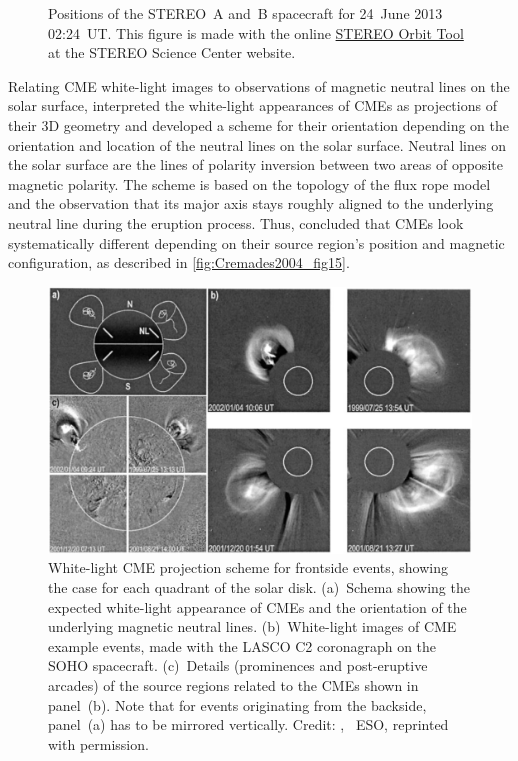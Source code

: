 \begin{figure}[htb]
\begin{floatrow}
{		}{
			\caption[]
			{Positions of the STEREO~A and~B spacecraft for 24~June 2013 02:24~UT. This figure is made with the online \href{https://stereo-ssc.nascom.nasa.gov/cgi-bin/make_where_gif}{STEREO Orbit Tool} at the STEREO Science Center website\protect\footnotemark.}
			\label{fig:STEREO_positions_w_269707595}
		}
	\end{floatrow}
\end{figure}

Relating CME white-light images to observations of magnetic neutral lines on the solar surface, \citet{Cremades2004} interpreted the white-light appearances of CMEs as projections of their 3D geometry and developed a scheme for their orientation depending on the orientation and location of the neutral lines on the solar surface. Neutral lines on the solar surface are the lines of polarity inversion between two areas of opposite magnetic polarity. The scheme is based on the topology of the flux rope model and the observation that its major axis stays roughly aligned to the underlying neutral line during the eruption process. Thus, \citet{Cremades2004} concluded that CMEs look systematically different depending on their source region's position and magnetic configuration, as described in \autoref{fig:Cremades2004_fig15}.
\begin{figure}[htb]
	\centering
	\includegraphics[width=\textwidth]{figures_of_others/images/Cremades2004_fig15.png}
	\caption[]
	{White-light CME projection scheme for frontside events, showing the case for each quadrant of the solar disk. (a)~Schema showing the expected white-light appearance of CMEs and the orientation of the underlying magnetic neutral lines. (b)~White-light images of CME example events, made with the LASCO C2 coronagraph on the SOHO spacecraft. (c)~Details (prominences and post-eruptive arcades) of the source regions related to the CMEs shown in panel~(b). Note that for events originating from the backside, panel~(a) has to be mirrored vertically. Credit: {\citet[Fig.~15]{Cremades2004}}, \textcopyright~ESO, reprinted with permission.}
	\label{fig:Cremades2004_fig15}
\end{figure}

